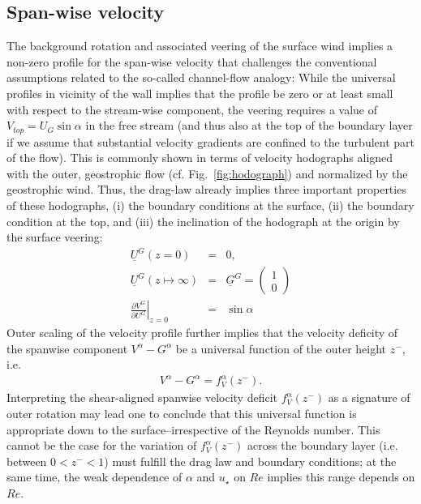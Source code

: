 \documentclass[a4paper,11pt]{article}
\begin{document}
\subsection{Span-wise velocity} 
%
The background rotation and associated veering of the surface wind implies a non-zero profile for the span-wise velocity that
challenges the conventional assumptions related to the so-called channel-flow analogy:
%
While the universal profiles in vicinity of the wall implies that the profile be zero or at least small with respect to the stream-wise
component, the veering requires a value of $V_{top}=U_G\sin\alpha$ in the free stream (and thus also at the top of the boundary layer if we assume
that substantial velocity gradients are confined to the turbulent part of the flow). 
%
This is commonly shown in terms of velocity hodographs aligned with the outer, geostrophic flow (cf. Fig.~\ref{fig:hodograph}) and normalized by
the geostrophic wind. 
%
Thus, the drag-law already implies three important properties of these hodographs,
(i) the boundary conditions at the surface,
(ii) the boundary condition at the top, and
(iii) the inclination of the hodograph at the origin by the surface veering:
\begin{subequations} 
\begin{eqnarray} 
 \underline{U}^{G}(z=0) &=& 0,\\ 
 \underline{U}^{G}(z\mapsto\infty) &=& \underline{G}^G = \left(\begin{array}{c}1\\0\end{array}\right) \\
   \left.\frac{\partial V^G}{\partial U^G}\right|_{z=0} &=& \sin\alpha
\end{eqnarray} 
\end{subequations} 
%
Outer scaling of the velocity profile further implies that the velocity deficity of the spanwise component $V^\alpha-G^\alpha$
be a universal function of the outer height $z^-$, i.e.  
\begin{eqnarray}
  V^\alpha-G^\alpha = f^\alpha_V(z^-).  
\end{eqnarray}
%
Interpreting the shear-aligned spanwise velocity deficit $f_{V}^{\alpha}(z^-)$ as 
a signature of outer rotation may lead one to conclude that this universal function
is appropriate down to the surface--irrespective of the Reynolds number.
%
This cannot be the case for the variation of $f_{V}^{\alpha}(z^-)$ across the boundary layer (i.e. between $0<z^-<1$)
must fulfill the drag law and boundary conditions;
at the same time, the weak dependence of $\alpha$ and $u_\star$ on $Re$ implies this range depends on $Re$.
%
%
\end{document}
